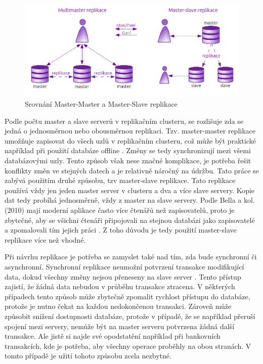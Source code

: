           \begin{figure}[H]
            \centering
            \includegraphics[scale=1]{../../../grafy/obr/schema_masterMasterSlave.png}
            \caption {Srovnání Master-Master a Master-Slave replikace}
            \label{srovnaniM-M-S}
          \end{figure}

Podle počtu master a slave serverů v replikačním clusteru, se rozlišuje zda se jedná o jednosměrnou nebo obousměrnou replikaci. Tzv. master-master replikace umožňuje zapisovat do všech uzlů v replikačním clusteru, což může být praktické například při použití databáze offline . Změny se tedy synchronizují mezi všemi databázovými uzly. Tento způsob však nese značné komplikace, je potřeba řešit konflikty změn ve stejných datech a je relativně náročný na údržbu. Tato práce se zabývá použitím druhé způsobu, tzv master-slave replikace. Tato replikace používá vždy jen jeden master server v clusteru a dva a více slave servery. Kopie dat tedy probíhá jednosměrně, vždy z master na slave servery. Podle Bella a kol. (2010) mají moderní aplikace často více čtenářů než zapisovatelů, proto je zbytečné, aby se všichni čtenáři připojovali na stejnou databázi jako zapisovatelé a zpomalovali tím jejich práci \citep{BellKindahlThalmann2010}. Z toho důvodu je tedy použití master-slave replikace více než vhodné.

Při návrhu replikace je potřeba se zamyslet také nad tím, zda bude synchronní či asynchronní. Synchronní replikace neumožní potvrzení transakce modifikující data, dokud všechny změny nejsou přeneseny na slave server \citep{Boszormenyi2013}. Tento přístup zajistí, že žádná data nebudou v průběhu transakce ztracena. V některých případech tento způsob může zbytečně zpomalit rychlost přístupu do databáze, protože je nutno čekat na každou nedokončenou transakci. Zároveň může způsobit snížení dostupnosti databáze, protože v případě, že se například přeruší spojení mezi servery, nemůže být na master serveru potvrzena žádná další transakce. Ale jistě si najde své opodstatění například při bankovních transakcích, kde je potřeba, aby všechny operace proběhly na obou stranách. V tomto případě je užití tohoto způsobu zcela nezbytné. 

